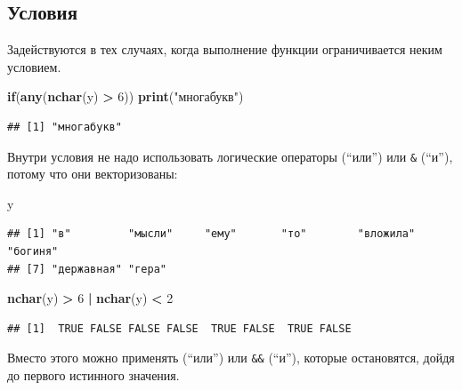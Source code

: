 \documentclass[
]{book}
\newenvironment{Shaded}{\begin{snugshade}}{\end{snugshade}}
\newcommand{\ControlFlowTok}[1]{\textcolor[rgb]{0.13,0.29,0.53}{\textbf{#1}}}
\newcommand{\DecValTok}[1]{\textcolor[rgb]{0.00,0.00,0.81}{#1}}
\newcommand{\FunctionTok}[1]{\textcolor[rgb]{0.13,0.29,0.53}{\textbf{#1}}}
\newcommand{\NormalTok}[1]{#1}
\newcommand{\SpecialCharTok}[1]{\textcolor[rgb]{0.81,0.36,0.00}{\textbf{#1}}}
\newcommand{\StringTok}[1]{\textcolor[rgb]{0.31,0.60,0.02}{#1}}
\theoremstyle{definition}
\theoremstyle{definition}
\theoremstyle{definition}
\theoremstyle{definition}
\theoremstyle{remark}
\begin{document}
\hypertarget{ux443ux441ux43bux43eux432ux438ux44f}{%
\subsection{Условия}\label{ux443ux441ux43bux43eux432ux438ux44f}}

Задействуются в тех случаях, когда выполнение функции ограничивается неким условием.

\begin{Shaded}
\begin{Highlighting}[]
\ControlFlowTok{if}\NormalTok{(}\FunctionTok{any}\NormalTok{(}\FunctionTok{nchar}\NormalTok{(y) }\SpecialCharTok{\textgreater{}} \DecValTok{6}\NormalTok{)) }\FunctionTok{print}\NormalTok{(}\StringTok{"многабукв"}\NormalTok{)}
\end{Highlighting}
\end{Shaded}

\begin{verbatim}
## [1] "многабукв"
\end{verbatim}

Внутри условия не надо использовать логические операторы \texttt{\textbar{}} (``или'') или \texttt{\&} (``и''), потому что они векторизованы:

\begin{Shaded}
\begin{Highlighting}[]
\NormalTok{y}
\end{Highlighting}
\end{Shaded}

\begin{verbatim}
## [1] "в"         "мысли"     "ему"       "то"        "вложила"   "богиня"   
## [7] "державная" "гера"
\end{verbatim}

\begin{Shaded}
\begin{Highlighting}[]
\FunctionTok{nchar}\NormalTok{(y) }\SpecialCharTok{\textgreater{}} \DecValTok{6} \SpecialCharTok{|} \FunctionTok{nchar}\NormalTok{(y) }\SpecialCharTok{\textless{}} \DecValTok{2}
\end{Highlighting}
\end{Shaded}

\begin{verbatim}
## [1]  TRUE FALSE FALSE FALSE  TRUE FALSE  TRUE FALSE
\end{verbatim}

Вместо этого можно применять \texttt{\textbar{}\textbar{}} (``или'') или \texttt{\&\&} (``и''), которые остановятся, дойдя до первого истинного значения.
\end{document}
